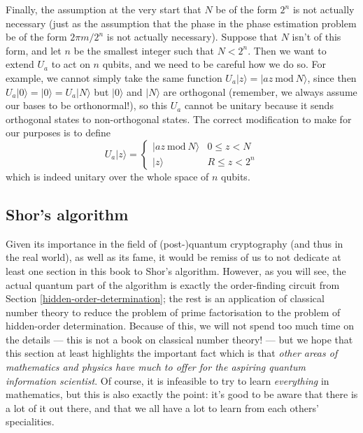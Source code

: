 \documentclass[fleqn,a4paper]{article}
\theoremstyle{definition}
\theoremstyle{definition}
\theoremstyle{definition}
\theoremstyle{definition}
\theoremstyle{remark}
\begin{document}
Finally, the assumption at the very start that \(N\) be of the form \(2^n\) is not actually necessary (just as the assumption that the phase in the phase estimation problem be of the form \(2\pi m/2^n\) is not actually necessary).
Suppose that \(N\) isn't of this form, and let \(n\) be the smallest integer such that \(N<2^n\).
Then we want to extend \(U_a\) to act on \(n\) qubits, and we need to be careful how we do so.
For example, we cannot simply take the same function \(U_a|z\rangle=|az\ \mathrm{mod}\ N\rangle\), since then \(U_a|0\rangle=|0\rangle=U_a|N\rangle\) but \(|0\rangle\) and \(|N\rangle\) are orthogonal (remember, we always assume our bases to be orthonormal!), so this \(U_a\) cannot be unitary because it sends orthogonal states to non-orthogonal states.
The correct modification to make for our purposes is to define
\[
  U_a|z\rangle
  = \begin{cases}
    |az\ \mathrm{mod}\ N\rangle
    & 0\leqslant z<N
  \\|z\rangle
    & R\leqslant z<2^n
  \end{cases}
\]
which is indeed unitary over the whole space of \(n\) qubits.

\hypertarget{shors-algorithm}{%
\subsection{Shor's algorithm}\label{shors-algorithm}}

Given its importance in the field of (post-)quantum cryptography (and thus in the real world), as well as its fame, it would be remiss of us to not dedicate at least one section in this book to Shor's algorithm.
However, as you will see, the actual quantum part of the algorithm is exactly the order-finding circuit from Section \ref{hidden-order-determination}; the rest is an application of classical number theory to reduce the problem of prime factorisation to the problem of hidden-order determination.
Because of this, we will not spend too much time on the details --- this is not a book on classical number theory! --- but we hope that this section at least highlights the important fact which is that \emph{other areas of mathematics and physics have much to offer for the aspiring quantum information scientist}.
Of course, it is infeasible to try to learn \emph{everything} in mathematics, but this is also exactly the point: it's good to be aware that there is a lot of it out there, and that we all have a lot to learn from each others' specialities.
\end{document}
